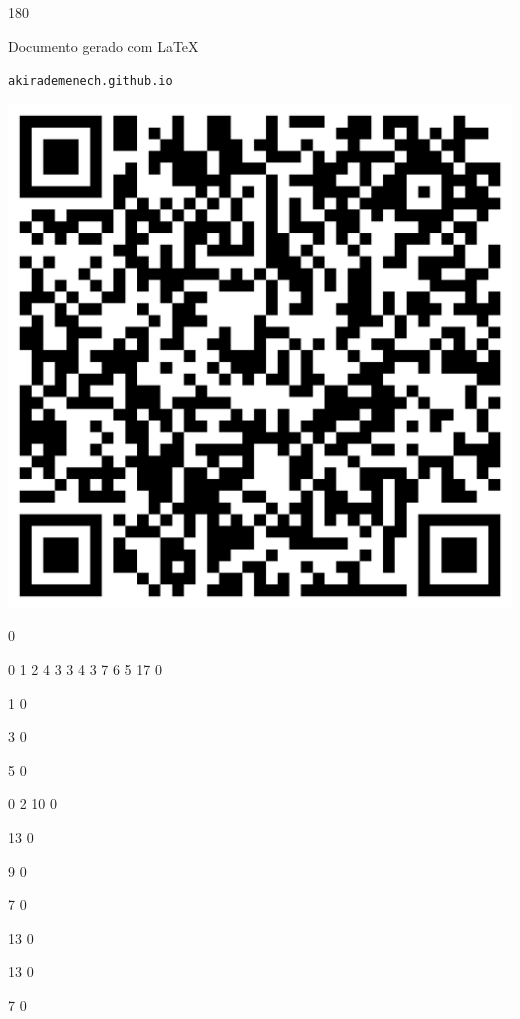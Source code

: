 \documentclass[12pt]{article}
\begin{document}
	\begin{turn}{180}	
		\begin{minipage}{\textwidth}		  
		  Documento gerado com \LaTeX			
		  
		  \texttt{akirademenech.github.io}

		  \includegraphics[height=0.3\textheight]{2e-2.pdf}

		\end{minipage}	
	\end{turn}  
		  
		\vfill  
		  
{
	0	%

	0	%
	1	%
	2	%
	4	%
	3	%
	3	%
	4	%
	3	%
	7	%
	6	%
	5	%
	17	%
	0	%

	1	%
	0	%

	3	%
	0	%

	5	%
	0	%

	0	%
	2	%
	10	%
	0	%

	13	%
	0	%

	9	%
	0	%

	7	%
	0	%

	13	%
	0	%

	13	%
	0	%

	7	%
	0	%

}	  
		    	
\end{document}
